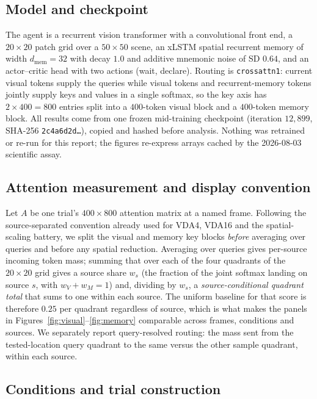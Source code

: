 \documentclass[10pt]{article}
\newcommand{\env}[1]{\texttt{#1}}
\begin{document}
\subsection{Model and checkpoint}

The agent is a recurrent vision transformer with a convolutional front end, a $20\times20$
patch grid over a $50\times50$ scene, an xLSTM spatial recurrent memory of width
$d_\mathrm{mem}=32$ with decay $1.0$ and additive mnemonic noise of SD $0.64$, and an
actor--critic head with two actions (wait, declare). Routing is \env{crossattn1}: current
visual tokens supply the queries while visual tokens and recurrent-memory tokens jointly
supply keys and values in a single softmax, so the key axis has $2\times400=800$ entries
split into a $400$-token visual block and a $400$-token memory block. All results come from
one frozen mid-training checkpoint (iteration $12{,}899$, SHA-256 \texttt{2c4a6d2d\dots}),
copied and hashed before analysis. Nothing was retrained or re-run for this report; the
figures re-express arrays cached by the 2026-08-03 scientific assay.

\subsection{Attention measurement and display convention}

Let $A$ be one trial's $400\times800$ attention matrix at a named frame. Following the
source-separated convention already used for VDA4, VDA16 and the spatial-scaling battery, we
split the visual and memory key blocks \emph{before} averaging over queries and before any
spatial reduction. Averaging over queries gives per-source incoming token mass; summing that
over each of the four quadrants of the $20\times20$ grid gives a source share $w_s$
(the fraction of the joint softmax landing on source $s$, with $w_V+w_M=1$) and, dividing by
$w_s$, a \emph{source-conditional quadrant total} that sums to one within each source. The
uniform baseline for that score is therefore $0.25$ per quadrant regardless of source, which
is what makes the panels in Figures~\ref{fig:visual}--\ref{fig:memory} comparable across
frames, conditions and sources. We separately report query-resolved routing: the mass sent
from the tested-location query quadrant to the same versus the other sample quadrant, within
each source.

\subsection{Conditions and trial construction}
\end{document}
